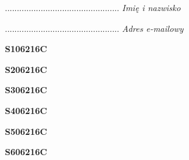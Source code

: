 \begin{turn}{90}\begin{minipage}{\linewidth} \vspace{20mm} ................................................  \textit{Imię i nazwisko}\end{minipage}\end{turn}

\begin{turn}{90}\begin{minipage}{\linewidth} \vspace{20mm} ................................................  \textit{Adres e-mailowy}\end{minipage}\end{turn}

\begin{turn}{90}\huge \begin{minipage}{\linewidth} \vspace{10mm}\textbf{S106216C}\end{minipage}\end{turn}

\begin{turn}{90}\huge \begin{minipage}{\linewidth} \vspace{10mm}\textbf{S206216C}\end{minipage}\end{turn}

\begin{turn}{90}\huge \begin{minipage}{\linewidth} \vspace{10mm}\textbf{S306216C}\end{minipage}\end{turn}

\begin{turn}{90}\huge \begin{minipage}{\linewidth} \vspace{10mm}\textbf{S406216C}\end{minipage}\end{turn}

\begin{turn}{90}\huge \begin{minipage}{\linewidth} \vspace{10mm}\textbf{S506216C}\end{minipage}\end{turn}

\begin{turn}{90}\huge \begin{minipage}{\linewidth} \vspace{10mm}\textbf{S606216C}\end{minipage}\end{turn}

